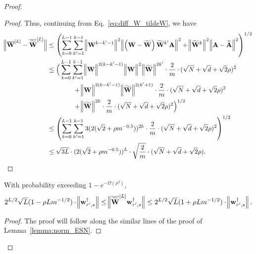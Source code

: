 \begin{claim}
\begin{proof}
\begin{proof}
					Thus, continuing from Eq.~\ref{eq:diff_W_tildeW}, we have
					\begin{align*}
						\norm[2]{\overline{\mathbf{W}}^{[L]} -  \overline{\widetilde{\mathbf{W}}}^{[L]}} &\le \left(\sum_{k=0}^{L-1} \sum_{k'=1}^{k-1} \norm[2]{ \mathbf{W}^{k-k'-1}}^2 \norm[2]{\left(\mathbf{W} - \widetilde{\mathbf{W}}\right)  \widetilde{\mathbf{W}}^{k'} \mathbf{A}}^2 + \norm[2]{ \widetilde{\mathbf{W}}^{k}}^2 \norm[2]{\mathbf{A} - \widetilde{\mathbf{A}} }^2 \right)^{1/2} \\&
						\le \Big(\sum_{k=0}^{L-1} \sum_{k'=1}^{k-1} \norm[2]{ \mathbf{W} }^{2(k-k'-1)} \norm[2]{\mathbf{W}}^2 \norm[2]{\widetilde{\mathbf{W}}}^{2k'}  \cdot \frac{2}{m} \cdot (\sqrt{N} + \sqrt{d} + \sqrt{2}\rho)^2 \\& \quad\quad\quad\quad 
						+ \norm[2]{ \mathbf{W} }^{2(k-k'-1)} \norm[2]{\widetilde{\mathbf{W}}}^{2(k'+1)}  \cdot \frac{2}{m} \cdot (\sqrt{N} + \sqrt{d} + \sqrt{2}\rho)^2  \\&\quad\quad\quad\quad + \norm[2]{ \widetilde{\mathbf{W}}}^{2k} \cdot \frac{2}{m} \cdot (\sqrt{N} + \sqrt{d} + \sqrt{2}\rho)^2  \Big)^{1/2} \\&
						\le \left(\sum_{k=0}^{L-1} \sum_{k'=1}^{k-1} 3(2 (\sqrt{2} + \rho m^{-0.5}))^{2k} \cdot \frac{2}{m} \cdot (\sqrt{N} + \sqrt{d} + \sqrt{2}\rho)^2   \right)^{1/2}\\&
						\le \sqrt{3L} \cdot (2 (\sqrt{2} + \rho m^{-0.5}))^{L} \cdot \sqrt{\frac{2}{m}} \cdot   (\sqrt{N} + \sqrt{d} + \sqrt{2}\rho).
					\end{align*}
				\end{proof}            
				
				\begin{claim}\label{Claimm:highprob_normW}
					With probability exceeding $1 - e^{-\Omega(\rho^2)}$,
					\begin{align*}
						2^{L/2} \sqrt{L} (1 -  \rho L m^{-1/2}) \cdot \norm[2]{\mathbf{w}_{r', s}^{\dagger}} \le \norm[2]{\overline{\widetilde{\mathbf{W}}}^{[L]} \mathbf{w}_{r', s}^{\dagger}} \le 2^{L/2} \sqrt{L} (1 + \rho L m^{-1/2}) \cdot \norm[2]{\mathbf{w}_{r', s}^{\dagger}}.
					\end{align*}
				\end{claim}
				
				\begin{proof}
					The proof will follow along the similar lines of the proof of Lemma~\ref{lemma:norm_ESN}.
				\end{proof}
				\fi 
				

\end{proof}
\end{claim}
